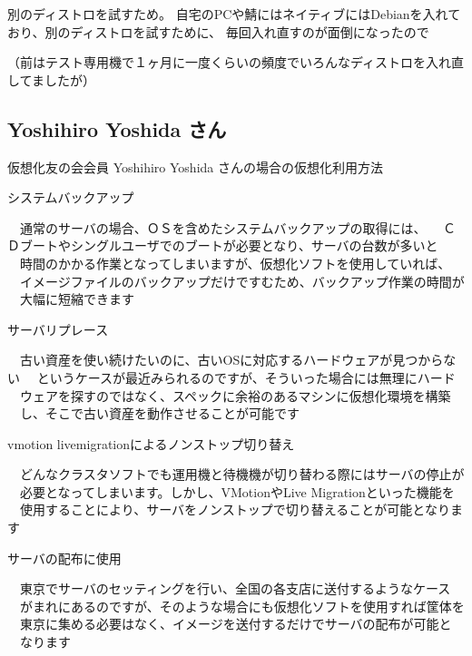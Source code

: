 \documentclass[cjk,dvipdfmx]{beamer}
\begin{document}
\begin{frame}{別のディストロを試すため。}
 自宅のPCや鯖にはネイティブにはDebianを入れており、別のディストロを試すために、
 毎回入れ直すのが面倒になったので

 （前はテスト専用機で１ヶ月に一度くらいの頻度でいろんなディストロを入れ直してましたが）
\end{frame}

\subsection{Yoshihiro Yoshida さん}

\begin{frame}{}
仮想化友の会会員 Yoshihiro Yoshida さんの場合の仮想化利用方法
\end{frame}

\begin{frame}
{システムバックアップ}

 　通常のサーバの場合、ＯＳを含めたシステムバックアップの取得には、
 　ＣＤブートやシングルユーザでのブートが必要となり、サーバの台数が多いと
 　時間のかかる作業となってしまいますが、仮想化ソフトを使用していれば、
 　イメージファイルのバックアップだけですむため、バックアップ作業の時間が
 　大幅に短縮できます
\end{frame}

\begin{frame}
{サーバリプレース}

 　古い資産を使い続けたいのに、古いOSに対応するハードウェアが見つからない
 　というケースが最近みられるのですが、そういった場合には無理にハード
 　ウェアを探すのではなく、スペックに余裕のあるマシンに仮想化環境を構築
 　し、そこで古い資産を動作させることが可能です
\end{frame}

\begin{frame}
{vmotion livemigrationによるノンストップ切り替え}

 　どんなクラスタソフトでも運用機と待機機が切り替わる際にはサーバの停止が
 　必要となってしまいます。しかし、VMotionやLive Migrationといった機能を
 　使用することにより、サーバをノンストップで切り替えることが可能となります
\end{frame}

\begin{frame}
{サーバの配布に使用}

 　東京でサーバのセッティングを行い、全国の各支店に送付するようなケース
 　がまれにあるのですが、そのような場合にも仮想化ソフトを使用すれば筐体を
 　東京に集める必要はなく、イメージを送付するだけでサーバの配布が可能と
 　なります
\end{frame}
\end{document}
